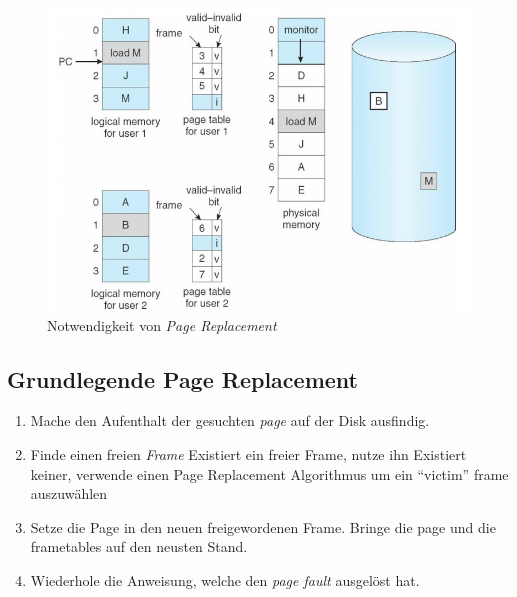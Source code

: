 \documentclass[a4paper]{scrreprt}
\begin{document}
\begin{figure}[ht]
\centering
\includegraphics[scale=0.4]{graphics/needreplacement.png}
\caption{Notwendigkeit von \textit{Page Replacement} }
\end{figure}

\subsection{Grundlegende Page Replacement}
\begin{enumerate}
\item Mache den Aufenthalt der gesuchten \textit{page} auf der Disk ausfindig.
\item Finde einen freien \textit{Frame}
\subitem Existiert ein freier Frame, nutze ihn
\subitem Existiert keiner, verwende einen Page Replacement Algorithmus um ein "`victim"' frame auszuwählen
\item Setze die Page in den neuen freigewordenen Frame. Bringe die page und die frametables auf den neusten Stand.
\item Wiederhole die Anweisung, welche den \textit{page fault} ausgelöst hat.
\end{enumerate}
\end{document}
